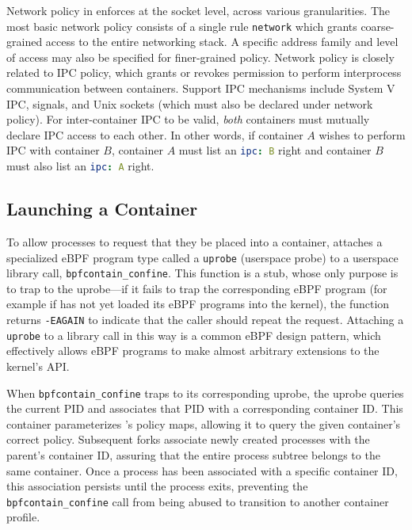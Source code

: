 Network policy in \bpfcontain{} enforces at the socket level, across various granularities. The most basic network policy consists of a single rule \texttt{network} which grants coarse-grained access to the entire networking stack. A specific address family and level of access may also be specified for finer-grained policy. Network policy is closely related to IPC policy, which grants or revokes permission to perform interprocess communication between containers. Support IPC mechanisms include System V IPC, signals, and Unix sockets (which must also be declared under network policy). For inter-container IPC to be valid, \textit{both} containers must mutually declare IPC access to each other. In other words, if container $A$ wishes to perform IPC with container $B$, container $A$ must list an \lstinline[language=yaml]{ipc: B} right and container $B$ must also list an \lstinline[language=yaml]{ipc: A} right.


\subsection{Launching a \bpfcontain{} Container}
\label{sub:launching}

To allow processes to request that they be placed into a container, \bpfcontain{} attaches a specialized eBPF program type called a \texttt{uprobe} (userspace probe) to a userspace library call, \texttt{bpfcontain\_confine}.  This function is a stub, whose only purpose is to trap to the uprobe---if it fails to trap the corresponding eBPF program (for example if \bpfcontain{} has not yet loaded its eBPF programs into the kernel), the function returns \texttt{-EAGAIN} to indicate that the caller should repeat the request. Attaching a \texttt{uprobe} to a library call in this way is a common eBPF design pattern, which effectively allows eBPF programs to make almost arbitrary extensions to the kernel's API.

When \texttt{bpfcontain\_confine} traps to its corresponding uprobe, the uprobe queries the current PID and associates that PID with a corresponding container ID. This container parameterizes \bpfcontain{}'s policy maps, allowing it to query the given container's correct policy. Subsequent forks associate newly created processes with the parent's container ID, assuring that the entire process subtree belongs to the same container. Once a process has been associated with a specific container ID, this association persists until the process exits, preventing the \texttt{bpfcontain\_confine} call from being abused to transition to another container profile.

